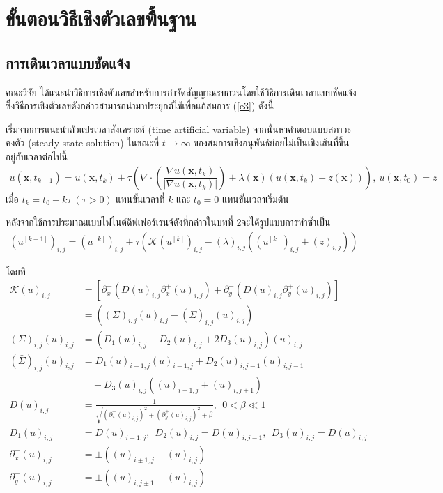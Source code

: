 \section{ขั้นตอนวิธีเชิงตัวเลขพื้นฐาน}

\subsection{การเดินเวลาแบบชัดแจ้ง}

\hspace{1cm} คณะวิจัย \cite{ref:ROF-template} ได้แนะนำวิธีการเชิงตัวเลขสำหรับการกำจัดสัญญาณรบกวนโดยใช้วิธีการเดินเวลาแบบชัดแจ้ง ซึ่งวิธีการเชิงตัวเลขดังกล่าวสามารถนำมาประยุกต์ใช้เพื่อแก้สมการ (\ref{e3})  ดังนี้
	
\hspace{1cm} เริ่มจากการแนะนําตัวแปรเวลาสังเคราะห์ (time artificial variable) จากนั้นหาคําตอบแบบสภาวะคงตัว (steady-state solution) ในขณะที่ $t\rightarrow \infty$ ของสมการเชิงอนุพันธ์ย่อยไม่เป็นเชิงเส้นที่ขึ้นอยู่กับเวลาต่อไปนี้ 
\begin{align}
	u(\mathbf{x},t_{k+1})=u(\mathbf{x},t_{k})+\tau\left(\nabla \cdot\left(\dfrac{\nabla u (\mathbf{x},t_k)}{| \nabla u (\mathbf{x},t_k) | }\right) + \lambda(\mathbf{x})(u (\mathbf{x},t_k)-z(\mathbf{x})) \right),\ u(\mathbf{x},t_0)=z
	\label{e4}
\end{align}
เมื่อ $t_k=t_0+k\tau\ (\tau>0)$  แทนขั้นเวลาที่ $k$ และ $t_0=0$ แทนขั้นเวลาเริ่มต้น

\hspace{1cm} หลังจากใช้การประมาณแบบไฟไนต์ดิฟเฟอร์เรนจ์ดังที่กล่าวในบทที่ 2จะได้รูปแบบการทำซ้ำเป็น 
\begin{align}
	(u^{[k+1]})_{i,j} = (u^{[k]})_{i,j}+\tau\left(\mathcal{K}(u^{[k]})_{i,j} - (\lambda)_{i,j} \left( (u^{[k]})_{i,j}+(z)_{i,j} \right) \right)
\end{align}

โดยที่
\begin{align*}
	\mathcal{K}(u)_{i,j}&=\left[{\partial_x^-} \left( {D(u)_{i,j}\partial_x^+(u)_{i,j}}\right)+ 
		{\partial_y^-} \left( {D(u)_{i,j}\partial_y^+(u)_{i,j}}\right)\right]\\
	&=\left( (\Sigma)_{i,j}(u)_{i,j}-(\bar\Sigma)_{i,j}(u)_{i,j}\right)\\
	(\Sigma)_{i,j}(u)_{i,j}&= \left( D_1(u)_{i,j}+D_2(u)_{i,j}+2D_3(u)_{i,j}\right)(u)_{i,j}\\
	(\bar\Sigma)_{i,j}(u)_{i,j}&= D_1(u)_{i-1,j}(u)_{i-1,j}+D_2(u)_{i,j-1}(u)_{i,j-1}\\
	&\quad+D_3(u)_{i,j}\left((u)_{i+1,j}+(u)_{i,j+1}\right) \\
	D(u)_{i,j} &= \tfrac{1}{\sqrt{(\partial_{x}^{+}(u)_{i,j})^2+(\partial_{y}^{+}(u)_{i,j})^2+\beta}},\ \ 0<\beta \ll 1\\
	D_1(u)_{i,j}&=D(u)_{i-1,j}, \ \
	D_2(u)_{i,j}=D(u)_{i,j-1}, \ \
	D_3(u)_{i,j}=D(u)_{i,j} \\
	\partial_{x}^{\pm}(u)_{i,j}&=\pm\left( (u)_{i \pm 1,j}-(u)_{i,j}\right)\\
	\partial_{y}^{\pm}(u)_{i,j}&=\pm\left( (u)_{i,j\pm 1}-(u)_{i,j}\right)
\end{align*}
	
